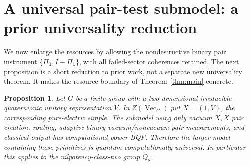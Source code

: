 \documentclass[11pt]{amsart}
\newtheorem{proposition}[theorem]{Proposition}
\theoremstyle{definition}\newtheorem{definition}[theorem]{Definition}
\newcommand{\one}{\mathbf1}
\newcommand{\VEC}{\operatorname{Vec}}
\begin{document}
\section{A universal pair-test submodel: a prior universality reduction}
We now enlarge the resources by allowing the nondestructive binary pair
instrument $\{\Pi_{\one},I-\Pi_{\one}\}$, with all failed-sector coherences
retained. The next proposition is a short reduction to prior work, not a
separate new universality theorem. It makes the resource boundary of
Theorem~\ref{thm:main} concrete.

\begin{proposition}\label{prop:binary}
Let $G$ be a finite group with a two-dimensional irreducible quaternionic
unitary representation $V$. In $Z(\VEC_G)$ put $X=(1,V)$, the corresponding
pure-electric simple. The submodel using only vacuum $X,X$ pair creation,
routing, adaptive binary vacuum/nonvacuum pair measurements, and classical
output has computational power BQP. Therefore the larger model containing
these primitives is quantum computationally universal. In particular this
applies to the nilpotency-class-two group $Q_8$.
\end{proposition}
\end{document}
